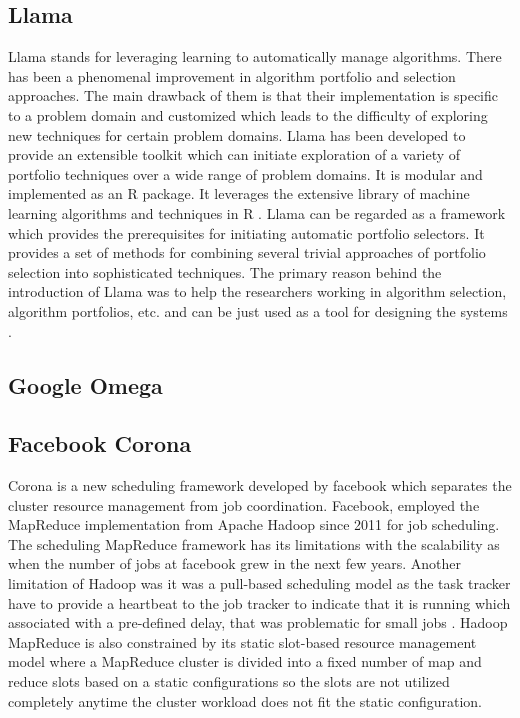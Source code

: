 {     \pv
      
\subsection{Llama}

     Llama stands for leveraging learning to automatically manage
     algorithms. There has been a phenomenal improvement in algorithm
     portfolio and selection approaches. The main drawback of them is
     that their implementation is specific to a problem domain and
     customized which leads to the difficulty of exploring new
     techniques for certain problem domains. Llama has been developed
     to provide an extensible toolkit which can initiate exploration
     of a variety of portfolio techniques over a wide range of problem
     domains. It is modular and implemented as an R package. It
     leverages the extensive library of machine learning algorithms
     and techniques in R \cite{lla1}. Llama can be regarded as a
     framework which provides the prerequisites for initiating
     automatic portfolio selectors. It provides a set of methods for
     combining several trivial approaches of portfolio selection into
     sophisticated techniques. The primary reason behind the
     introduction of Llama was to help the researchers working in
     algorithm selection, algorithm portfolios, etc. and can be just
     used as a tool for designing the systems \cite{lla1}.
     
\subsection{Google Omega}

\pv 

\subsection{Facebook Corona}

     Corona is a new scheduling framework developed by facebook which
     separates the cluster resource management from job coordination.
     Facebook, employed the MapReduce implementation from Apache
     Hadoop since 2011 for job scheduling. The scheduling MapReduce
     framework has its limitations with the scalability as when the
     number of jobs at facebook grew in the next few years. Another
     limitation of Hadoop was it was a pull-based scheduling model as
     the task tracker have to provide a heartbeat to the job tracker to
     indicate that it is running which associated with a pre-defined
     delay, that was problematic for small jobs 
     \cite{www-facebook-corona}. Hadoop MapReduce is also constrained
     by its static slot-based resource management model where a
     MapReduce cluster is divided into a fixed number of map and
     reduce slots based on a static configurations so the slots are
     not utilized completely anytime the cluster workload does not fit
     the static configuration.

}
